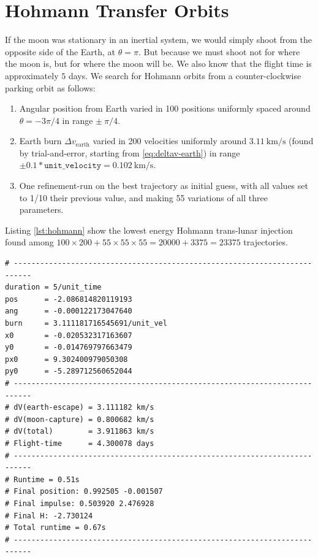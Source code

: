 \section{Hohmann Transfer Orbits}
If the moon was stationary in an inertial system, we would simply shoot from the opposite side of the Earth, at $\theta = \pi$. But because we must shoot not for where the moon is, but for where the moon will be. We also know that the flight time is approximately $5$ days. We search for Hohmann orbits from a counter-clockwise parking orbit as follows:
\begin{enumerate}
    \item Angular position from Earth varied in 100 positions uniformly spaced around $\theta=-3\pi/4$ in range $\pm\ \pi/4.$
    \item Earth burn $\Delta v_{\text{earth}}$ varied in 200 velocities uniformly around $\SI{3.11}{\km\per\s}$ (found by trial-and-error, starting from \ref{eq:deltav-earth}) in range $\pm 0.1*\texttt{unit\_velocity} = \SI{0.102}{\km\per\s}.$
    \item One refinement-run on the best trajectory as initial guess, with all values set to 1/10 their previous value, and making 55 variations of all three parameters.
\end{enumerate}

Listing \ref{lst:hohmann} show the lowest energy Hohmann trans-lunar injection found among $100 \times 200 + 55 \times 55 \times 55  = 20000 + 3375 = 23375$ trajectories.

\begin{adjustwidth*}{0cm}{-0.4cm}
\begin{lstlisting}[caption={Best Hohmann orbit. \texttt{pos} = angular difference with start angle (here $\theta=-3\pi/4$), \texttt{ang} = thrust angle to velocity vector in Earth parking orbit, \texttt{burn} = $\Delta v_{\text{earth}}$, \texttt{(x0,y0,px0,py0)} are the initial conditions.},label=lst:hohmann]
# --------------------------------------------------------------------------
duration = 5/unit_time
pos      = -2.086814820119193
ang      = -0.000122173047640
burn     = 3.111181716545691/unit_vel
x0       = -0.020532317163607
y0       = -0.014769797663479
px0      = 9.302400979050308
py0      = -5.289712560652044
# --------------------------------------------------------------------------
# dV(earth-escape) = 3.111182 km/s
# dV(moon-capture) = 0.800682 km/s
# dV(total)        = 3.911863 km/s
# Flight-time      = 4.300078 days
# --------------------------------------------------------------------------
# Runtime = 0.51s
# Final position: 0.992505 -0.001507
# Final impulse: 0.503920 2.476928
# Final H: -2.730124
# Total runtime = 0.67s
# --------------------------------------------------------------------------
\end{lstlisting}
\end{adjustwidth*}

